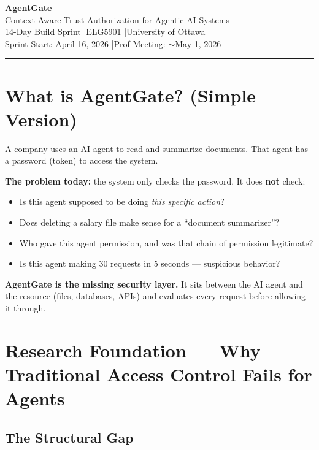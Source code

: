 \documentclass[12pt, a4paper]{article}
\begin{document}
\begin{center}
  {\LARGE \textbf{\textcolor{accentblue}{AgentGate}}}\\[4pt]
  {\large Context-Aware Trust Authorization for Agentic AI Systems}\\[6pt]
  {\normalsize 14-Day Build Sprint \quad|\quad ELG5901 \quad|\quad University of Ottawa}\\[4pt]
  {\small Sprint Start: April 16, 2026 \quad|\quad Prof Meeting: $\sim$May 1, 2026}
\end{center}

\vspace{0.5cm}
\hrule
\vspace{0.5cm}

\section{What is AgentGate? (Simple Version)}

A company uses an AI agent to read and summarize documents. That agent has a
password (token) to access the system.

\textbf{The problem today:} the system only checks the password. It does \textbf{not} check:
\begin{itemize}[noitemsep]
  \item Is this agent supposed to be doing \textit{this specific action}?
  \item Does deleting a salary file make sense for a ``document summarizer''?
  \item Who gave this agent permission, and was that chain of permission legitimate?
  \item Is this agent making 30 requests in 5 seconds — suspicious behavior?
\end{itemize}

\textbf{AgentGate is the missing security layer.} It sits between the AI agent and the
resource (files, databases, APIs) and evaluates every request before allowing it
through.

\section{Research Foundation — Why Traditional Access Control Fails for Agents}

\subsection{The Structural Gap}
\end{document}
